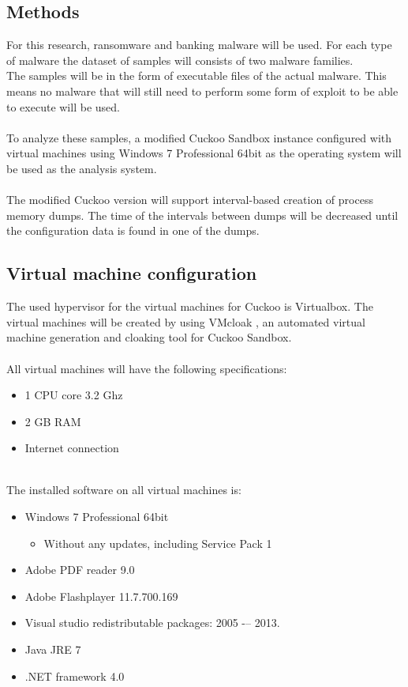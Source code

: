 \documentclass[conference]{IEEEtran}
\begin{document}
\subsection{Methods}

For this research, ransomware and banking malware will be used. For each type of malware the dataset of samples will consists of two malware families.\\
The samples will be in the form of executable files of the actual malware. This means no malware that will still need to perform some form of exploit to be able to execute will be used.\\\\To analyze these samples, a modified Cuckoo Sandbox instance configured with virtual machines using Windows 7  Professional 64bit as the operating system will be used as the analysis system. \\\\The modified Cuckoo version will support interval-based creation of process memory dumps. The time of the intervals between dumps will be decreased until the \Gls{configuration data} is found in one of the dumps.


\subsection{Virtual machine configuration}

The used hypervisor for the virtual machines for Cuckoo is Virtualbox. The virtual machines will be created by using VMcloak \cite{vmcloak}, an automated virtual machine generation and cloaking tool for Cuckoo Sandbox.\\\\
All virtual machines will have the following specifications:
\begin{itemize}
\item 1 CPU core 3.2 Ghz
\item 2 GB RAM
\item Internet connection
\end{itemize}
\ \\
The installed software on all virtual machines is:
\begin{itemize}
\item Windows 7 Professional 64bit
\begin{itemize}
\item Without any updates, including Service Pack 1
\end{itemize}
\item Adobe PDF reader 9.0
\item Adobe Flashplayer 11.7.700.169
\item Visual studio redistributable packages: 2005 -– 2013.
\item Java JRE 7
\item .NET framework 4.0
\end{itemize}
\end{document}

